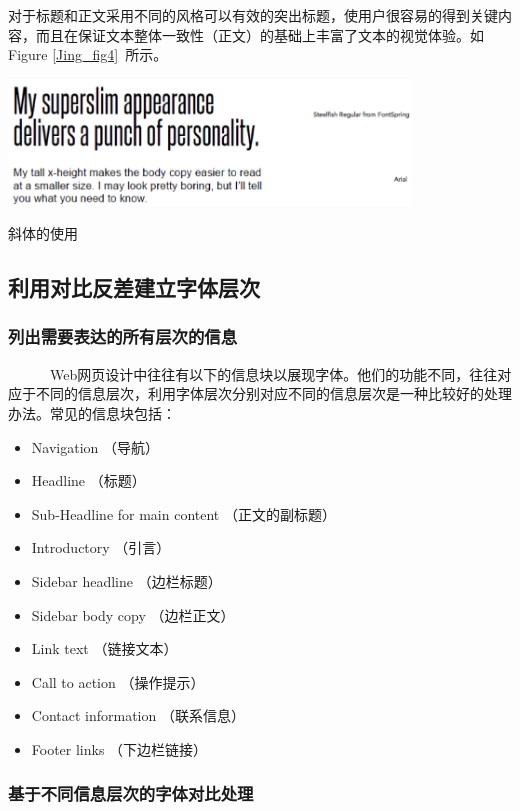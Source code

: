 \documentclass[a4paper]{article}
\begin{document}
\begin{itemize}
	对于标题和正文采用不同的风格可以有效的突出标题，使用户很容易的得到关键内容，而且在保证文本整体一致性（正文）的基础上丰富了文本的视觉体验。如Figure \ref{Jing_fig4}~所示。
	
\makeatletter
\def\@captype{figure}
\makeatother
\centerline{\includegraphics [width=0.8\textwidth]{Jing_fig4.png} }
\caption{斜体的使用 }
\label{Jing_fig4}
	
\end{itemize}

\subsection{利用对比反差建立字体层次}

\subsubsection{列出需要表达的所有层次的信息}

~~~~~~Web网页设计中往往有以下的信息块以展现字体。他们的功能不同，往往对应于不同的信息层次，利用字体层次分别对应不同的信息层次是一种比较好的处理办法。常见的信息块包括：
\begin{itemize}
\item Navigation （导航）
\item Headline （标题）
\item Sub-Headline for main content （正文的副标题）
\item Introductory （引言）
\item Sidebar headline （边栏标题）
\item Sidebar body copy （边栏正文）
\item Link text （链接文本）
\item Call to action （操作提示）
\item Contact information （联系信息）
\item Footer links （下边栏链接）
\end{itemize}
\subsubsection{基于不同信息层次的字体对比处理}
\end{document}
